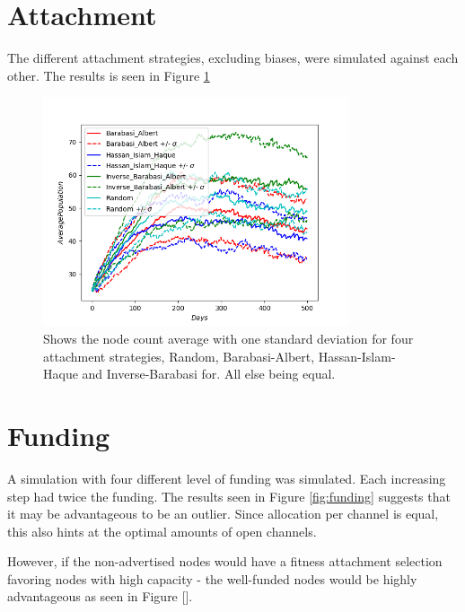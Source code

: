 \section{Attachment}

The different attachment strategies, excluding biases, were simulated against each other. The results is seen in Figure \ref{fig:history_attachment} 

\begin{figure}[!htb]
	
	\hspace*{-0.5cm}
	\centering
	\includegraphics[width=9cm]{images/histories_deviation_attachment.png}
	\caption{ Shows the node count average with one standard deviation for four attachment strategies, Random, Barabasi-Albert, Hassan-Islam-Haque and Inverse-Barabasi for. All else being equal. }
	\label{fig:history_attachment}
	\hspace*{2mm} 
\end{figure}

\section{Funding}

A simulation with four different level of funding was simulated. Each increasing step had twice the funding. The results seen in Figure \ref{fig:funding} suggests that it may be advantageous to be an outlier. Since allocation per channel is equal, this also hints at the optimal amounts of open channels.

However, if the non-advertised nodes would have a fitness attachment selection favoring nodes with high capacity - the well-funded nodes would be highly advantageous as seen in Figure [].  

\newpage

